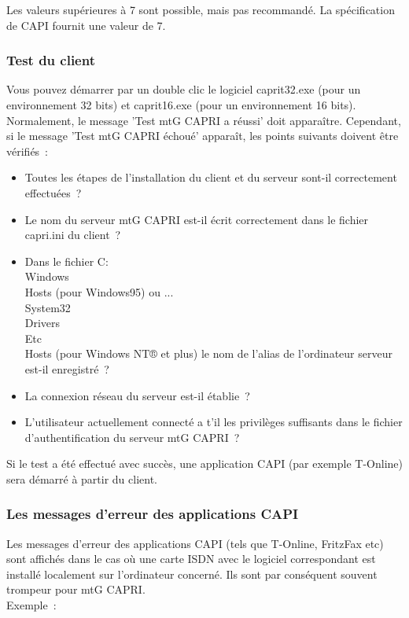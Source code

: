 \begin{description}
    Les valeurs supérieures à 7 sont possible, mais pas recommandé. La spécification de CAPI fournit
	une valeur de 7.

\end{description}

\subsubsection{Test du client}

	Vous pouvez démarrer par un double clic le logiciel caprit32.exe (pour un environnement 32 bits)
	et caprit16.exe (pour un environnement 16 bits). Normalement, le message 'Test mtG CAPRI a réussi'
	doit apparaître. Cependant, si le message 'Test mtG CAPRI échoué' apparaît, les points suivants doivent
	être vérifiés~:
    \begin{itemize}
        \item Toutes les étapes de l'installation du client et du serveur sont-il correctement effectuées~?
        \item Le nom du serveur mtG CAPRI est-il écrit correctement dans le fichier capri.ini du client~?
        \item Dans le fichier C:\\Windows\\Hosts (pour Windows95) ou ...\\System32\\Drivers\\Etc\\Hosts
            (pour Windows NT® et plus) le nom de l'alias de l'ordinateur serveur est-il enregistré~?
        \item La connexion réseau du serveur est-il établie~?
        \item L'utilisateur actuellement connecté a t'il les privilèges suffisants dans le fichier
			d'authentification du serveur mtG CAPRI~?
    \end{itemize}

    Si le test a été effectué avec succès, une application CAPI (par exemple T-Online) sera démarré
	à partir du client.

\subsubsection{Les messages d'erreur des applications CAPI}

    Les messages d'erreur des applications CAPI (tels que T-Online, FritzFax etc) sont affichés dans
	le cas où une carte ISDN avec le logiciel correspondant est installé localement sur l'ordinateur concerné.
	Ils sont par conséquent souvent trompeur pour mtG CAPRI. \\
    Exemple~: \\

